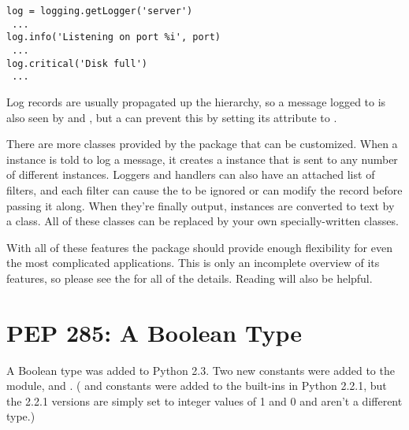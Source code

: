 \documentclass{howto}
\begin{document}
\begin{verbatim}
log = logging.getLogger('server')
 ...
log.info('Listening on port %i', port)
 ...
log.critical('Disk full')
 ...
\end{verbatim}

Log records are usually propagated up the hierarchy, so a message
logged to  is also seen by  and
, but a  can prevent this by setting its
 attribute to .

There are more classes provided by the  package that
can be customized.  When a  instance is told to log a
message, it creates a  instance that is sent to any
number of different  instances.  Loggers and handlers
can also have an attached list of filters, and each filter can cause
the  to be ignored or can modify the record before
passing it along.  When they're finally output, 
instances are converted to text by a  class.  All of
these classes can be replaced by your own specially-written classes.

With all of these features the  package should provide
enough flexibility for even the most complicated applications.  This
is only an incomplete overview of its features, so please see the
for all of the details.  Reading  will also be helpful.


\begin{seealso}


\end{seealso}


\section{PEP 285: A Boolean Type\label{section-bool}}

A Boolean type was added to Python 2.3.  Two new constants were added
to the  module,  and
.  ( and
 constants were added to the built-ins
in Python 2.2.1, but the 2.2.1 versions are simply set to integer values of
1 and 0 and aren't a different type.)
\end{document}

